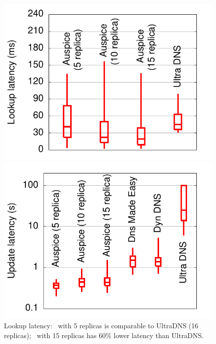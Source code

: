 

\begin{figure}[ht]
\vspace{0.05in}
\begin{minipage}[b]{0.48\linewidth}
\centering
\includegraphics[scale=0.55]{graph/newgraphs/managed-lookup.pdf}
\figvsp
\caption{Lookup latency:  \auspice\ with 5 replicas is comparable to UltraDNS (16 replicas); \auspice\ with 15 replicas has 60\% lower latency than UltraDNS.}
\label{fig:managed-lookup}
\end{minipage}
\hspace{0.2in}
\begin{minipage}[b]{0.48\linewidth}
\centering
\includegraphics[scale=0.55]{graph/newgraphs/managed-update.pdf}

\end{minipage}
\end{figure}
